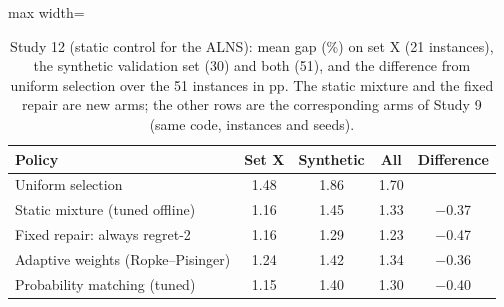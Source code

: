 \begin{table}[t]
\caption{Study 12 (static control for the ALNS): mean gap (\%) on set X (21 instances), the synthetic validation set (30) and both (51), and the difference from uniform selection over the 51 instances in pp. The static mixture and the fixed repair are new arms; the other rows are the corresponding arms of Study 9 (same code, instances and seeds).}\label{tab:s12}
\centering
\small
\begin{adjustbox}{max width=\linewidth}
\begin{tabular}{lcccc}
\toprule
Policy & Set X & Synthetic & All & Difference \\
\midrule
Uniform selection & 1.48 & 1.86 & 1.70 \\
Static mixture (tuned offline) & 1.16 & 1.45 & 1.33 & $-$0.37 \\
Fixed repair: always regret-2 & 1.16 & 1.29 & 1.23 & $-$0.47 \\
Adaptive weights (Ropke--Pisinger) & 1.24 & 1.42 & 1.34 & $-$0.36 \\
Probability matching (tuned) & 1.15 & 1.40 & 1.30 & $-$0.40 \\
\bottomrule
\end{tabular}
\end{adjustbox}
\end{table}
